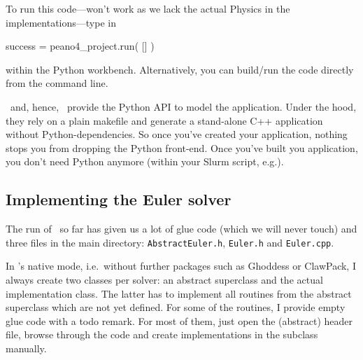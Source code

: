 \noindent
To run this code---won't work as we lack the actual Physics in the
implementations---type in
\begin{code}
success = peano4_project.run( [] )
\end{code}
within the Python workbench. 
Alternatively, you can build/run the code directly from the command line. 

\begin{definition}
 \Peano\ and, hence, \ExaHyPE\ provide the Python API to model the application. 
 Under the hood, they rely on a plain makefile and generate a stand-alone C++
 application without Python-dependencies.
 So once you've created your application, nothing stops you from dropping the
 Python front-end. 
 Once you've built you application, you don't need Python anymore (within your
 Slurm script, e.g.).
\end{definition}



\subsection{Implementing the Euler solver}

The run of \ExaHyPE\ so far has given us a lot of glue code (which we will
never touch) and three files in the main directory:
\texttt{AbstractEuler.h}, \texttt{Euler.h} and \texttt{Euler.cpp}.

\begin{definition}
  In \ExaHyPE's native mode, i.e.~without further packages such as Ghoddess or
  ClawPack, I always create two classes per solver: an abstract superclass and
  the actual implementation class.
  The latter has to implement all routines from the abstract superclass which
  are not yet defined.
  For some of the routines, I provide empty glue code with a todo remark. 
  For most of them, just open the (abstract) header file, browse through the
  code and create implementations in the subclass manually.
\end{definition}

